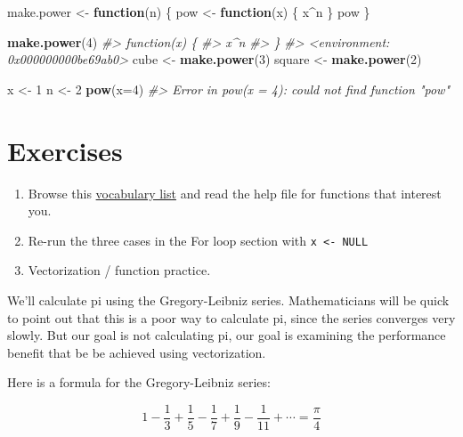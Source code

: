 \documentclass[]{book}
\newenvironment{Shaded}{\begin{snugshade}}{\end{snugshade}}
\newcommand{\KeywordTok}[1]{\textcolor[rgb]{0.13,0.29,0.53}{\textbf{#1}}}
\newcommand{\DataTypeTok}[1]{\textcolor[rgb]{0.13,0.29,0.53}{#1}}
\newcommand{\DecValTok}[1]{\textcolor[rgb]{0.00,0.00,0.81}{#1}}
\newcommand{\StringTok}[1]{\textcolor[rgb]{0.31,0.60,0.02}{#1}}
\newcommand{\CommentTok}[1]{\textcolor[rgb]{0.56,0.35,0.01}{\textit{#1}}}
\newcommand{\ControlFlowTok}[1]{\textcolor[rgb]{0.13,0.29,0.53}{\textbf{#1}}}
\newcommand{\OperatorTok}[1]{\textcolor[rgb]{0.81,0.36,0.00}{\textbf{#1}}}
\newcommand{\NormalTok}[1]{#1}
\providecommand{\tightlist}{%
  \setlength{\itemsep}{0pt}\setlength{\parskip}{0pt}}
\theoremstyle{definition}
\theoremstyle{definition}
\theoremstyle{definition}
\theoremstyle{remark}
\begin{document}
\begin{Shaded}
\begin{Highlighting}[]
\NormalTok{make.power <-}\StringTok{ }\ControlFlowTok{function}\NormalTok{(n) \{}
\NormalTok{  pow <-}\StringTok{ }\ControlFlowTok{function}\NormalTok{(x) \{}
\NormalTok{    x}\OperatorTok{^}\NormalTok{n }
\NormalTok{  \}}
\NormalTok{  pow}
\NormalTok{\}}

\KeywordTok{make.power}\NormalTok{(}\DecValTok{4}\NormalTok{)}
\CommentTok{#> function(x) \{}
\CommentTok{#>     x^n }
\CommentTok{#>   \}}
\CommentTok{#> <environment: 0x000000000be69ab0>}
\NormalTok{cube <-}\StringTok{ }\KeywordTok{make.power}\NormalTok{(}\DecValTok{3}\NormalTok{)}
\NormalTok{square <-}\StringTok{ }\KeywordTok{make.power}\NormalTok{(}\DecValTok{2}\NormalTok{)}

\NormalTok{x <-}\StringTok{ }\DecValTok{1}
\NormalTok{n <-}\StringTok{ }\DecValTok{2}
\KeywordTok{pow}\NormalTok{(}\DataTypeTok{x=}\DecValTok{4}\NormalTok{)}
\CommentTok{#> Error in pow(x = 4): could not find function "pow"}
\end{Highlighting}
\end{Shaded}

\section{Exercises}\label{exercises-1}

\begin{enumerate}
\def\labelenumi{\arabic{enumi}.}
\tightlist
\item
  Browse this \href{http://adv-r.had.co.nz/Vocabulary.html}{vocabulary
  list} and read the help file for functions that interest you.
\item
  Re-run the three cases in the For loop section with
  \texttt{x\ \textless{}-\ NULL}
\item
  Vectorization / function practice.
\end{enumerate}

We'll calculate pi using the Gregory-Leibniz series. Mathematicians will
be quick to point out that this is a poor way to calculate pi, since the
series converges very slowly. But our goal is not calculating pi, our
goal is examining the performance benefit that be be achieved using
vectorization.

Here is a formula for the Gregory-Leibniz series:

\begin{equation}
1 - \frac{1}{3} + \frac{1}{5} - \frac{1}{7} + \frac{1}{9} - \frac{1}{11} + \cdots = \frac{\pi}{4}
\end{equation}
\end{document}
